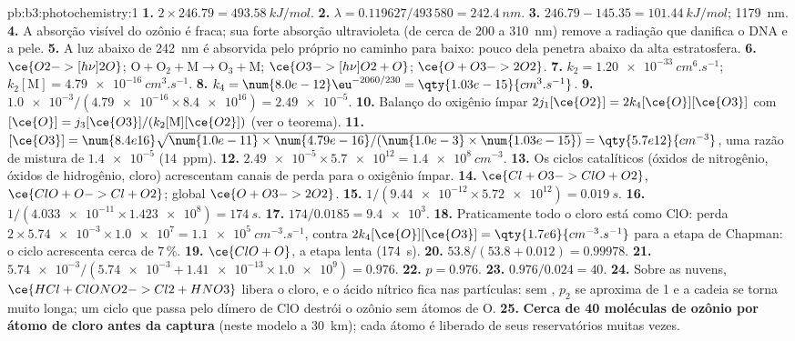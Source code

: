 \begin{solution}{pb:b3:photochemistry:1}
\textbf{1.} $2 \times 246.79 = \qty{493.58}{kJ/mol}$.
\textbf{2.} $\lambda = 0.119627/493\,580 = \qty{242.4}{nm}$.
\textbf{3.} $246.79 - 145.35 = \qty{101.44}{kJ/mol}$; \qty{1179}{nm}.
\textbf{4.} A absorção visível do ozônio é fraca; sua forte absorção ultravioleta
(de cerca de 200 a \qty{310}{nm}) remove a radiação que danifica o DNA e a pele.
\textbf{5.} A luz abaixo de \qty{242}{nm} é absorvida pelo próprio  no caminho para baixo:
pouco dela penetra abaixo da alta estratosfera.
\textbf{6.} $\ce{O2 ->[h\nu] 2 O}$; $\mathrm{O + O_2 + M \to O_3 + M}$; $\ce{O3 ->[h\nu] O2 + O}$; $\ce{O + O3 -> 2 O2}$.
\textbf{7.} $k_2 = \qty{1.20e-33}{cm^6.s^{-1}}$; $k_2[\mathrm M] = \qty{4.79e-16}{cm^3.s^{-1}}$.
\textbf{8.} $k_4 = \num{8.0e-12}\eu^{-2060/230} = \qty{1.03e-15}{cm^3.s^{-1}}$.
\textbf{9.} $\num{1.0e-3}/(\num{4.79e-16} \times \num{8.4e16}) = \num{2.49e-5}$.
\textbf{10.} Balanço do oxigênio ímpar $2j_1[\ce{O2}] = 2k_4[\ce{O}][\ce{O3}]$ com $[\ce{O}] = j_3[\ce{O3}]/(k_2[\mathrm M][\ce{O2}])$ (ver o
teorema).
\textbf{11.} $[\ce{O3}] = \num{8.4e16}\sqrt{\num{1.0e-11} \times \num{4.79e-16}/(\num{1.0e-3} \times \num{1.03e-15})} =
\qty{5.7e12}{cm^{-3}}$, uma razão de mistura de $\num{1.4e-5}$ (\qty{14}{ppm}).
\textbf{12.} $\num{2.49e-5} \times \num{5.7e12} = \qty{1.4e8}{cm^{-3}}$.
\textbf{13.} Os ciclos catalíticos (óxidos de nitrogênio, óxidos de hidrogênio, cloro)
acrescentam canais de perda para o oxigênio ímpar.
\textbf{14.} $\ce{Cl + O3 -> ClO + O2}$, $\ce{ClO + O -> Cl + O2}$; global $\ce{O + O3 -> 2 O2}$.
\textbf{15.} $1/(\num{9.44e-12} \times \num{5.72e12}) = \qty{0.019}{s}$.
\textbf{16.} $1/(\num{4.033e-11} \times \num{1.423e8}) = \qty{174}{s}$.
\textbf{17.} $174/0.0185 = \num{9.4e3}$.
\textbf{18.} Praticamente todo o cloro está como ClO: perda $2 \times \num{5.74e-3} \times \num{1.0e7} = \qty{1.1e5}{cm^{-3}.s^{-1}}$,
contra $2k_4[\ce{O}][\ce{O3}] = \qty{1.7e6}{cm^{-3}.s^{-1}}$ para a etapa de Chapman: o ciclo acrescenta
cerca de 7\,\%.
\textbf{19.} $\ce{ClO + O}$, a etapa lenta (\qty{174}{s}).
\textbf{20.} $53.8/(53.8 + 0.012) = 0.99978$.
\textbf{21.} $\num{5.74e-3}/(\num{5.74e-3} + \num{1.41e-13} \times \num{1.0e9}) = 0.976$.
\textbf{22.} $p = 0.976$.
\textbf{23.} $0.976/0.024 = 40$.
\textbf{24.} Sobre as nuvens, $\ce{HCl + ClONO2 -> Cl2 + HNO3}$ libera o cloro, e o ácido nítrico
fica nas partículas: sem , $p_2$ se aproxima de 1 e a cadeia se torna
muito longa; um ciclo que passa pelo dímero de ClO destrói o ozônio sem átomos de O.
\textbf{25.} \textbf{Cerca de 40 moléculas de ozônio por átomo de cloro antes da captura} (neste
modelo a \qty{30}{km}); cada átomo é liberado de seus reservatórios muitas vezes.
\end{solution}
